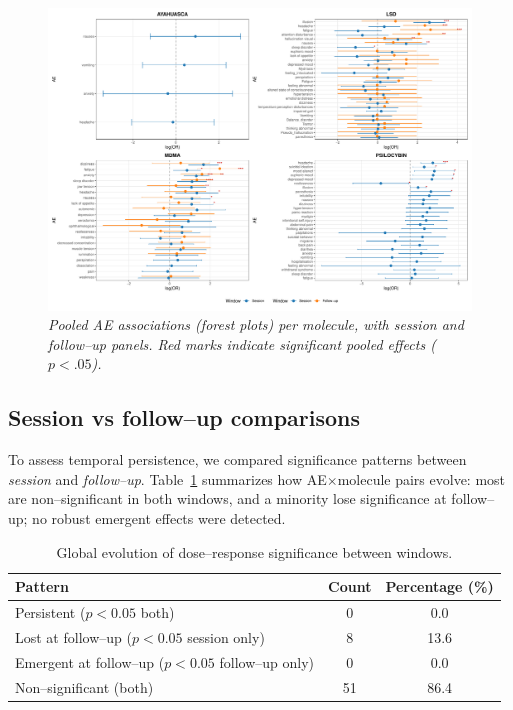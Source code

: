 \documentclass[12pt,a4paper]{article}
\begin{document}
\begin{figure}[ht!]
\centering
\includegraphics[width=0.95\linewidth]{figures/forest_combined_all_molecules.pdf}
\caption{\textit{Pooled AE associations (forest plots) per molecule, with session and follow--up panels. Red marks indicate significant pooled effects ($p<.05$).}}
\label{fig:forest_combined}
\end{figure}

\subsection{Session vs follow--up comparisons}
To assess temporal persistence, we compared significance patterns between \emph{session} and \emph{follow--up}. Table~\ref{tab:global_patterns} summarizes how AE$\times$molecule pairs evolve: most are non--significant in both windows, and a minority lose significance at follow--up; no robust emergent effects were detected.

\begin{table}[ht!]
\centering
\caption{Global evolution of dose--response significance between windows.}
\label{tab:global_patterns}
\begin{tabular}{lcc}
\toprule
Pattern & Count & Percentage (\%) \\
\midrule
Persistent ($p<0.05$ both)              & 0  & 0.0 \\
Lost at follow--up ($p<0.05$ session only) & 8  & 13.6 \\
Emergent at follow--up ($p<0.05$ follow--up only) & 0  & 0.0 \\
Non--significant (both)                  & 51 & 86.4 \\
\bottomrule
\end{tabular}
\end{table}
\end{document}
